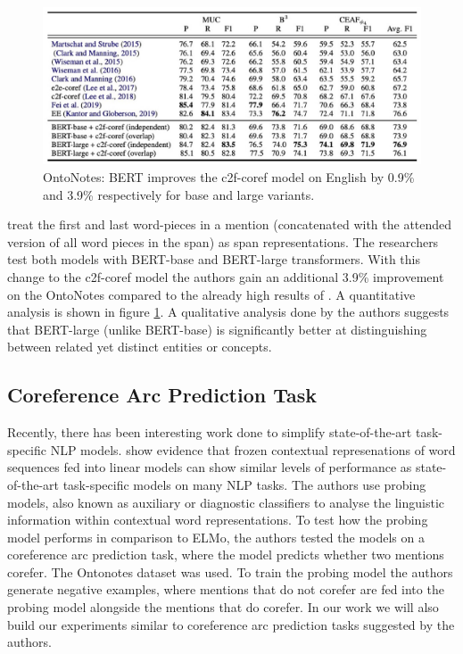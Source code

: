 \documentclass[11pt]{article}
\begin{document}
\begin{figure}[h]
  \includegraphics[width=\textwidth]{joshi_results.eps}
  \caption{OntoNotes: BERT improves the c2f-coref model on English by 0.9\% and 3.9\% respectively for base and large variants. \parencite{joshi2019coref}}
  \label{fig:joshiresults}
\end{figure}

\textcite{joshi2019coref} treat the first and last word-pieces in a mention (concatenated with the
attended version of all word pieces in the span) as span representations. The researchers test both models with BERT-base and BERT-large transformers. With this change to the c2f-coref model the authors gain an additional 3.9\% improvement on the OntoNotes compared to the already high results of \textcite{lee2018higher}. A quantitative analysis is shown in  figure \ref{fig:joshiresults}. 
A qualitative analysis done by the authors suggests that BERT-large (unlike BERT-base) is significantly better at distinguishing between related yet distinct entities or concepts.


\subsection{Coreference Arc Prediction Task}



Recently, there has been interesting work done to simplify state-of-the-art task-specific NLP models. 
 \textcite{liu2019linguistic} show evidence that frozen contextual represenations of word sequences fed into linear models can show similar levels of performance as state-of-the-art task-specific models on many NLP tasks.
The authors use probing models, also known as auxiliary or diagnostic classifiers \parencite{shi2016string, kadar2017representation} to analyse the linguistic information within contextual word representations. To test how the probing model performs in comparison to ELMo, the authors tested the models on a coreference arc prediction task, where the model predicts whether two mentions corefer. The Ontonotes dataset was used. To train the probing model the authors generate negative examples, where mentions that do not corefer are fed into the probing model alongside the mentions that do corefer. In our work we will also build our experiments similar to coreference arc prediction tasks suggested by the authors.
\end{document}
